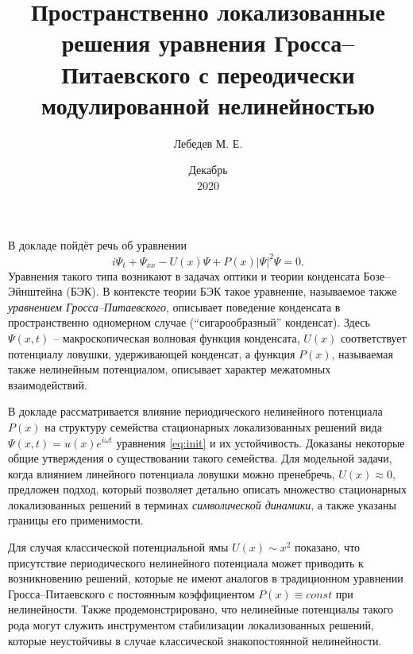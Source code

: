 \documentclass [a4paper] {article}
\title{Пространственно локализованные решения уравнения Гросса--Питаевского с переодически модулированной нелинейностью}
\author{Лебедев М. Е.}
\affil{Институт математики с вычислительным центром \\ УФИЦ РАН}
\date{Декабрь \\ 2020}
\begin{document}
\maketitle
\thispagestyle{empty} %

В докладе пойдёт речь об уравнении
\begin{equation}
i \Psi_t + \Psi_{xx} - U(x) \Psi + P(x) |\Psi|^2 \Psi = 0.
\label{eq:init}
\end{equation}
Уравнения такого типа возникают в задачах оптики и теории конденсата Бозе--Эйнштейна (БЭК).
В контексте теории БЭК такое уравнение, называемое также {\it уравнением Гросса--Питаевского}, описывает поведение конденсата в пространственно одномерном случае (``сигарообразный'' конденсат).
Здесь $\Psi(x, t)$ -- макроскопическая волновая функция конденсата, $U(x)$ соответствует потенциалу ловушки, удерживающей конденсат, а функция $P(x)$, называемая также нелинейным потенциалом, описывает характер межатомных взаимодействий.

В докладе рассматривается влияние периодического нелинейного потенциала $P(x)$ на структуру семейства стационарных локализованных решений вида $\Psi(x, t) = u(x) e^{i \omega t}$ уравнения \eqref{eq:init} и их устойчивость.
Доказаны некоторые общие утверждения о существовании такого семейства.
Для модельной задачи, когда влиянием линейного потенциала ловушки можно пренебречь, $U(x) \approx 0$, предложен подход, который позволяет детально описать множество стационарных локализованных решений в терминах {\it символической динамики}, а также указаны границы его применимости.

Для случая классической потенциальной ямы $U(x) \sim x^2$ показано, что присутствие периодического нелинейного потенциала может приводить к возникновению решений, которые не имеют аналогов в традиционном уравнении Гросса--Питаевского с постоянным коэффициентом $P(x) \equiv const$ при нелинейности.
Также продемонстрировано, что нелинейные потенциалы такого рода могут служить инструментом стабилизации локализованных решений, которые неустойчивы в случае классической знакопостоянной нелинейности.
\end{document}
